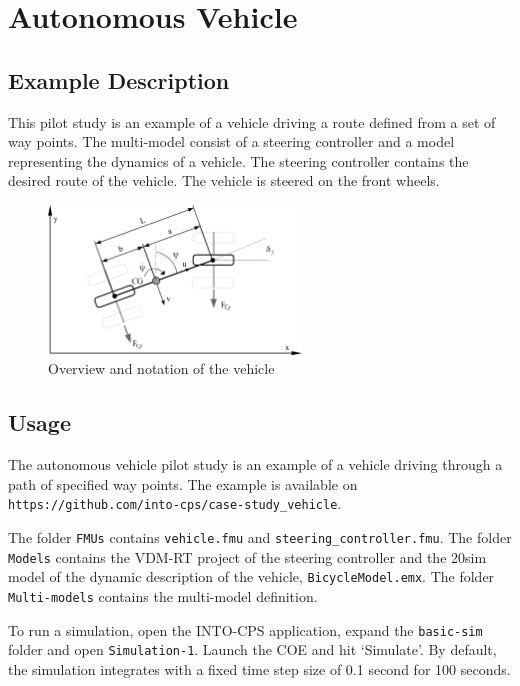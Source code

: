 \section{Autonomous Vehicle}
\label{sec:bicycle}

\subsection{Example Description}
This pilot study is an example of a vehicle driving a route defined from a set of way points. The multi-model consist of a steering controller and a model representing the dynamics of a vehicle. The steering controller contains the desired route of the vehicle. The vehicle is steered on the front wheels. 

\begin{figure}[htbp]
\begin{center}
\includegraphics[width=0.6\textwidth]{vehicle/bicycle.png}
\caption{Overview and notation of the vehicle}
\label{fig:bicyclemodel_overview}
\end{center}
\end{figure}

\subsection{Usage} \label{sec:bicycle_usage}
The autonomous vehicle pilot study is an example of a vehicle driving through a path of specified way points. The example is available on \texttt{https://github.com/into-cps/case-study\_vehicle}. 

The folder \texttt{FMUs} contains \texttt{vehicle.fmu} and \texttt{steering\_controller.fmu}. The folder \texttt{Models} contains the VDM-RT project of the steering controller and the 20sim model of the dynamic description of the vehicle, \texttt{BicycleModel.emx}. The folder \texttt{Multi-models} contains the multi-model definition.  

To run a simulation, open the INTO-CPS application, expand the \texttt{basic-sim} folder and open \texttt{Simulation-1}. Launch the COE and hit `Simulate'. 
By default, the simulation integrates with a fixed time step size of 0.1 second for 100 seconds. \newline

